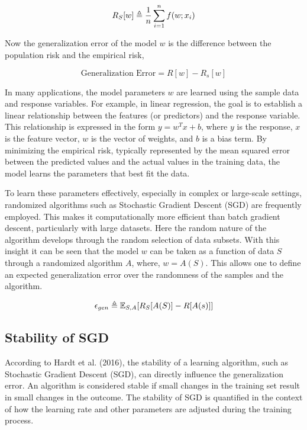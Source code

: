 \begin{align}
    \label{eq: empirical risk}
     R_{S}[w] \triangleq \frac{1}{n}\sum_{i = 1}^n f(w;x_i)
\end{align}

Now the generalization error of the model $w$ is the difference between the population risk and the empirical risk,

\begin{equation}
    \label{eq: generalization error}
    \text{Generalization Error} = R[w] - R_s[w]
\end{equation}

In many applications, the model parameters $w$ are learned using the sample data and response variables. For example, in linear regression, the goal is to establish a linear relationship between the features (or predictors) and the response variable. This relationship is expressed in the form $y = w^Tx + b$, where $y$ is the response, $x$ is the feature vector, $w$ is the vector of weights, and $b$ is a bias term. By minimizing the empirical risk, typically represented by the mean squared error between the predicted values and the actual values in the training data, the model learns the parameters that best fit the data.

To learn these parameters effectively, especially in complex or large-scale settings, randomized algorithms such as Stochastic Gradient Descent (SGD) are frequently employed. This makes it computationally more efficient than batch gradient descent, particularly with large datasets. Here the random nature of the algorithm develops through the random selection of data subsets. With this insight it can be seen that the model $w$ can be taken as a function of data $S$ through a randomized algorithm $A$, where, $w = A(S)$. This allows one to define an expected generalization error over the randomness of the samples and the algorithm. 

\begin{align}
    \epsilon_{gen} \triangleq \mathbb{E}_{S,A} [R_S[A(S)] - R[A(s)]]
\end{align}






\subsection{Stability of SGD}
According to Hardt et al. (2016), the stability of a learning algorithm, such as Stochastic Gradient Descent (SGD), can directly influence the generalization error. An algorithm is considered stable if small changes in the training set result in small changes in the outcome. The stability of SGD is quantified in the context of how the learning rate and other parameters are adjusted during the training process.

